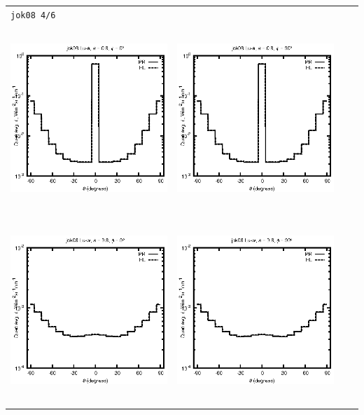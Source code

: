 \begin{tabular}{c c c c}
\multicolumn{4}{l}{\texttt{jok08 4/6}} \\
\includegraphics[height=7cm]{../eps/jok08_Lu_a_fwd.eps} &
\includegraphics[height=7cm]{../eps/jok08_Lu_a_cross.eps}\\
\includegraphics[height=7cm]{../eps/jok08_Lu_w_fwd.eps} &
\includegraphics[height=7cm]{../eps/jok08_Lu_w_cross.eps} \\

\end{tabular}
